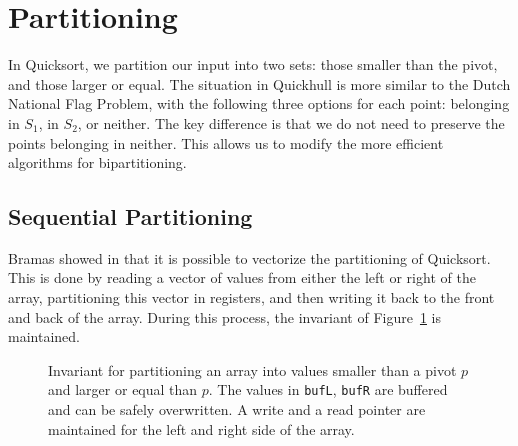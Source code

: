 \section{Partitioning}

In Quicksort, we partition our input into two sets: those smaller than the 
pivot, and those larger or equal. The situation in Quickhull is more similar
to the Dutch National Flag Problem, with the following three options for each
point: belonging in $S_1$, in $S_2$, or neither. The key difference is that
we do not need to preserve the points belonging in neither. This allows us
to modify the more efficient algorithms for bipartitioning.

\subsection{Sequential Partitioning}

Bramas showed in \cite{} that it is possible to vectorize the partitioning
of Quicksort. This is done by reading a vector of values from either the
left or right of the array, partitioning this vector in registers, and
then writing it back to the front and back of the array. During this process,
the invariant of Figure~\ref{fig:invariant_bramas} is maintained.

\begin{figure}[ht]
    \caption{Invariant for partitioning an array into values smaller than
             a pivot $p$ and larger or equal than $p$. The values in
             \texttt{bufL}, \texttt{bufR} are buffered and can be safely
             overwritten. A write and a read pointer are maintained for
             the left and right side of the array.}
    \label{fig:invariant_bramas}
\end{figure}

